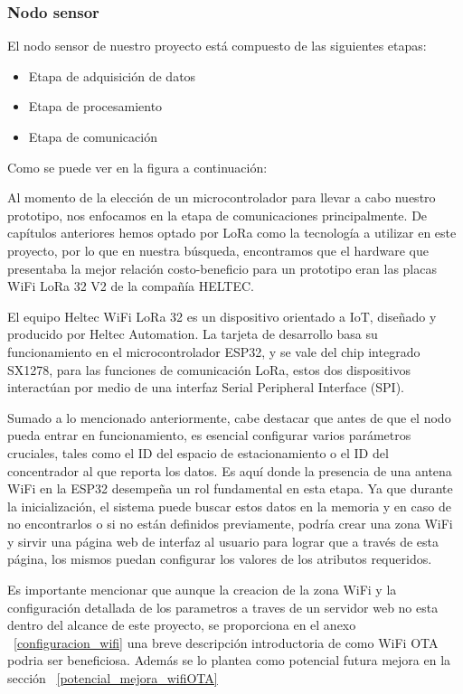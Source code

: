\subsubsection{Nodo sensor}
El nodo sensor de nuestro proyecto está compuesto de las siguientes etapas:

\begin{itemize}
    \item Etapa de adquisición de datos
    \item Etapa de procesamiento
    \item Etapa de comunicación
\end{itemize}

Como se puede ver en la figura a continuación:


Al momento de la elección de un microcontrolador para llevar a cabo nuestro prototipo, nos enfocamos en la etapa de comunicaciones principalmente. De capítulos anteriores hemos optado por LoRa como la tecnología a utilizar en este proyecto, por lo que en nuestra búsqueda, encontramos que el hardware que presentaba la mejor relación costo-beneficio para un prototipo eran las placas WiFi LoRa 32 V2 de la compañía HELTEC.

El equipo Heltec WiFi LoRa 32 es un dispositivo orientado a IoT, diseñado y producido por Heltec Automation. La tarjeta de desarrollo basa su funcionamiento en el microcontrolador ESP32, y se vale del chip integrado SX1278, para las funciones de comunicación LoRa, estos dos dispositivos interactúan por medio de una interfaz Serial Peripheral Interface (SPI).

Sumado a lo mencionado anteriormente, cabe destacar que antes de que el nodo pueda entrar en funcionamiento, es esencial 
configurar varios parámetros cruciales, tales como el ID del espacio de estacionamiento o el ID del concentrador al 
que reporta los datos. Es aquí donde la presencia de una antena WiFi en la ESP32 desempeña un rol fundamental en esta etapa. 
Ya que durante la inicialización, el sistema puede buscar estos datos en la memoria y en caso de no encontrarlos o si no 
están definidos previamente, podría crear una zona WiFi y sirvir una página web de interfaz al usuario para lograr que 
a través de esta página, los mismos puedan configurar los valores de los atributos requeridos.

Es importante mencionar que aunque la creacion de la zona WiFi y la configuración detallada de los parametros a traves de un
servidor web no esta dentro del alcance de este proyecto, se proporciona en el anexo ~\ref{configuracion_wifi} una breve descripción introductoria
de como WiFi OTA podria ser beneficiosa. Además se lo plantea como potencial futura mejora en la sección ~\ref{potencial_mejora_wifiOTA}

